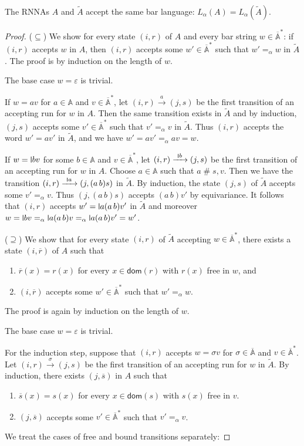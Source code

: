 \documentclass[10pt,a4paper]{amsart}
\newcommand{\midmid}{\hspace{0.2ex}{\rule[-0.1ex]{0.6pt}{1.65ex}}\hspace{0.2ex}}
\newcommand{\scriptmidmid}{\hspace{0.2ex}{\rule[-0.1ex]{0.6pt}{1.1ex}}\hspace{0.2ex}}
\newcommand{\newletter}[1]{{\midmid}#1}
\newcommand{\scriptnew}[1]{{\scriptmidmid}#1}
\newcommand{\barA}{\overline{\names}}
\numberwithin{equation}{section}
\newcommand{\ol}{\overline}
\newcommand{\xto}[1]{\xrightarrow{~#1~}}
\newcommand{\seq}{\subseteq}
\newcommand{\tl}{\widetilde}
\newcommand{\dom}{\mathsf{dom}}
\renewcommand{\epsilon}{\varepsilon}
\newcommand{\+}[1]{\mathcal{#1}\xspace}
\newcommand{\names}{\mathbb{A}}
\newcommand{\fresh}{\mathbin{\#}}
\theoremstyle{definition}
\begin{document}
%
\begin{lemma}\label{lem:ndc_lang}
  The RNNAs $A$ and $\tl A$ accept the same bar language: $L_\alpha(A)=L_\alpha(\tl{A})$.
\end{lemma}
%
\begin{proof}
  ($\seq$) We show for every state $(i,r)$ of $A$ and every bar string
  $w\in \barA^*$: if $(i,r)$ accepts $w$ in $A$, then $(i,r)$ accepts
  some $w'\in \barA^*$ such that $w'=_\alpha w$ in $\tl{A}$. The proof
  is by induction on the length of $w$.

  \smallskip\noindent The base case $w=\epsilon$ is trivial. 

  \smallskip\noindent If $w=av$ for $a\in \names$ and $v\in \barA^*$,
  let $(i,r)\xto{a} (j,s)$ be the first transition of an accepting run
  for $w$ in $A$. Then the same transition exists in $\tl{A}$ and by
  induction, $(j,s)$ accepts some $v'\in \barA^*$ such that
  $v'=_\alpha v$ in $\tl{A}$. Thus $(i,r)$ accepts the word $w'=av'$
  in $\tl{A}$, and we have $w'=av'=_\alpha av = w$.

  \smallskip\noindent If $w=\newletter bv$ for some $b\in \names$ and
  $v\in \barA^*$, let $(i,r)\xto{\scriptnew b} (j,s)$ be the first
  transition of an accepting run for $w$ in $A$. Choose $a\in \names$
  such that $a\fresh s,v$. Then we have the transition
  $(i,r)\xto{\scriptnew a} (j,(a\, b)s)$ in $\tl{A}$. By induction,
  the state $(j,s)$ of $\tl{A}$ accepts some $v'=_\alpha v$. Thus
  $(j, (a\, b) s)$ accepts $(a\,b)v'$ by equivariance. It follows that
  $(i,r)$ accepts $w'=\newletter a(a\, b)v'$ in $\tl{A}$ and moreover
  $w=\newletter bv =_\alpha \newletter a(a\, b)v =_\alpha \newletter
  a(a\, b) v'=w'$.

  \medskip\noindent($\supseteq$) We show that for every state $(i,r)$
  of $\tl{A}$ accepting $w\in \barA^*$, there exists a state
  $(i,\ol{r})$ of $A$ such that
  \begin{enumerate}
  \item\label{cond:1} $\ol{r}(x)=r(x)$ for every $x\in \dom(r)$ with $r(x)$ free in
    $w$, and
  \item\label{cond:2} $(i,\ol{r})$ accepts some $w'\in \barA^*$ such that $w'=_\alpha w$.
  \end{enumerate}
  The proof is again by induction on the length of $w$.

  \smallskip\noindent The base case $w=\epsilon$ is trivial.

  \smallskip\noindent For the induction step, suppose that $(i,r)$
  accepts $w=\sigma v$ for $\sigma \in \barA$ and $v\in \barA^*$. Let
  $(i,r)\xto{\sigma} (j,s)$ be the first transition of an accepting
  run for $w$ in $\tl{A}$. By induction, there exists $(j,\ol{s})$ in
  $A$ such that
  \begin{enumerate}%
  \item $\ol{s}(x)=s(x)$ for every $x\in \dom(s)$ with $s(x)$ free in $v$.
  \item $(j,\ol{s})$ accepts some $v'\in \barA^*$ such that $v'=_\alpha v$.
  \end{enumerate}
  We treat the cases of free and bound transitions separately:


\end{proof}
\end{document}
